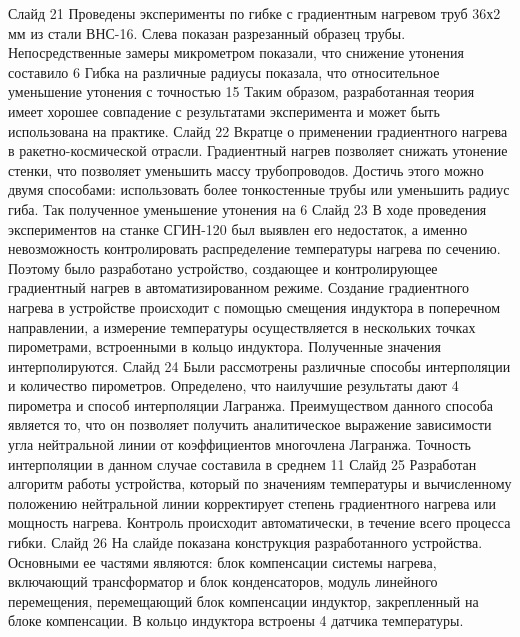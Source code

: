 Слайд 21
Проведены эксперименты по гибке с градиентным нагревом труб 36х2 мм из стали ВНС-16. Слева показан разрезанный образец трубы. Непосредственные замеры микрометром показали, что снижение утонения составило 6%
Гибка на различные радиусы показала, что относительное уменьшение утонения с точностью 15%
Таким образом, разработанная теория имеет хорошее совпадение с результатами эксперимента и может быть использована на практике.
Слайд 22
Вкратце о применении градиентного нагрева в ракетно-космической отрасли. Градиентный нагрев позволяет снижать утонение стенки, что позволяет уменьшить массу трубопроводов. Достичь этого можно двумя способами: использовать более тонкостенные трубы или уменьшить радиус гиба. Так полученное уменьшение утонения на 6%
Слайд 23
В ходе проведения экспериментов на станке СГИН-120 был выявлен его недостаток, а именно невозможность контролировать распределение температуры нагрева по сечению. Поэтому было разработано устройство, создающее и контролирующее градиентный нагрев в автоматизированном режиме.
Создание градиентного нагрева в устройстве происходит с помощью смещения индуктора в поперечном направлении, а измерение температуры осуществляется в нескольких точках пирометрами, встроенными в кольцо индуктора. Полученные значения интерполируются.
Слайд 24
Были рассмотрены различные способы интерполяции и количество пирометров. Определено, что наилучшие результаты дают 4 пирометра и способ интерполяции Лагранжа. Преимуществом данного способа является то, что он позволяет получить аналитическое выражение зависимости угла нейтральной линии от коэффициентов многочлена Лагранжа. Точность интерполяции в данном случае составила в среднем 11%
Слайд 25
Разработан алгоритм работы устройства, который по значениям температуры и вычисленному положению нейтральной линии корректирует степень градиентного нагрева или мощность нагрева. Контроль происходит автоматически, в течение всего процесса гибки.
Слайд 26
На слайде показана конструкция разработанного устройства. Основными ее частями являются: блок компенсации системы нагрева, включающий трансформатор и блок конденсаторов, модуль линейного перемещения, перемещающий блок компенсации индуктор, закрепленный на блоке компенсации. В кольцо индуктора встроены 4 датчика температуры.
